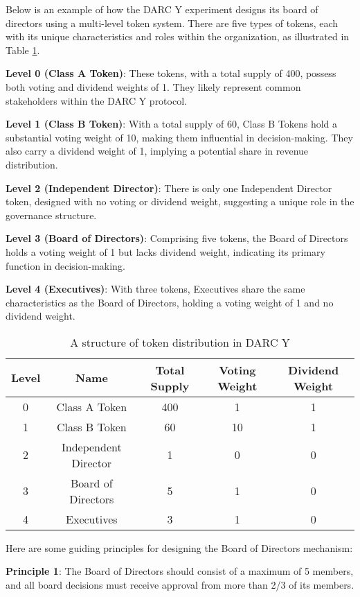 \documentclass[main.tex]{subfiles}
\begin{document}
Below is an example of how the DARC Y experiment designs its board of directors using a multi-level token system. There are five types of tokens, each with its unique characteristics and roles within the organization, as illustrated in Table \ref{table:3}.

\textbf{Level 0 (Class A Token)}: These tokens, with a total supply of 400, possess both voting and dividend weights of 1. They likely represent common stakeholders within the DARC Y protocol.

\textbf{Level 1 (Class B Token)}: With a total supply of 60, Class B Tokens hold a substantial voting weight of 10, making them influential in decision-making. They also carry a dividend weight of 1, implying a potential share in revenue distribution.

\textbf{Level 2 (Independent Director)}: There is only one Independent Director token, designed with no voting or dividend weight, suggesting a unique role in the governance structure.

\textbf{Level 3 (Board of Directors)}: Comprising five tokens, the Board of Directors holds a voting weight of 1 but lacks dividend weight, indicating its primary function in decision-making.

\textbf{Level 4 (Executives)}: With three tokens, Executives share the same characteristics as the Board of Directors, holding a voting weight of 1 and no dividend weight.

\begin{table}[h!]
\centering
\begin{tabular}{||c c c c c||} 
 \hline
 Level & Name & Total Supply & Voting Weight & Dividend Weight \\ [0.5ex] 
 \hline\hline

 0 & Class A Token & 400 & 1 & 1 \\
 1 & Class B Token & 60 & 10 & 1 \\
 2 & Independent Director & 1 & 0 & 0 \\
 3 & Board of Directors & 5 & 1 & 0 \\
 4 & Executives & 3 & 1 & 0  \\
 \hline
\end{tabular}
\caption{A structure of token distribution in DARC Y}
\label{table:3}
\end{table}


Here are some guiding principles for designing the Board of Directors mechanism:

\textbf{Principle 1}: The Board of Directors should consist of a maximum of 5 members, and all board decisions must receive approval from more than 2/3 of its members.
\end{document}
